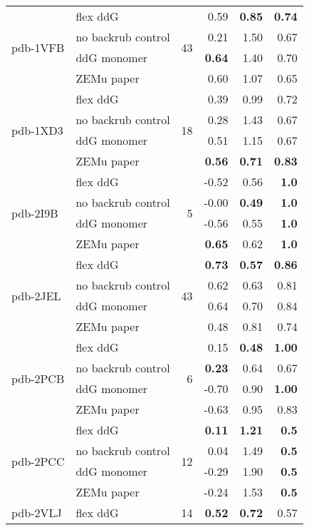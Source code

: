 \begin{longtable}{llrrrr}
\hline
 \multirow{ 4}{*}{pdb-1VFB} & flex ddG & \multirow{ 4}{*}{43} & 0.59 & \textbf{0.85} & \textbf{0.74}  \\
 & no backrub control & & 0.21 & 1.50 & 0.67  \\
 & ddG monomer & & \textbf{0.64} & 1.40 & 0.70  \\
 & ZEMu paper & & 0.60 & 1.07 & 0.65  \\
\hline
 \multirow{ 4}{*}{pdb-1XD3} & flex ddG & \multirow{ 4}{*}{18} & 0.39 & 0.99 & 0.72  \\
 & no backrub control & & 0.28 & 1.43 & 0.67  \\
 & ddG monomer & & 0.51 & 1.15 & 0.67  \\
 & ZEMu paper & & \textbf{0.56} & \textbf{0.71} & \textbf{0.83}  \\
\hline
 \multirow{ 4}{*}{pdb-2I9B} & flex ddG & \multirow{ 4}{*}{5} & -0.52 & 0.56 & \textbf{1.0}  \\
 & no backrub control & & -0.00 & \textbf{0.49} & \textbf{1.0}  \\
 & ddG monomer & & -0.56 & 0.55 & \textbf{1.0}  \\
 & ZEMu paper & & \textbf{0.65} & 0.62 & \textbf{1.0}  \\
\hline
 \multirow{ 4}{*}{pdb-2JEL} & flex ddG & \multirow{ 4}{*}{43} & \textbf{0.73} & \textbf{0.57} & \textbf{0.86}  \\
 & no backrub control & & 0.62 & 0.63 & 0.81  \\
 & ddG monomer & & 0.64 & 0.70 & 0.84  \\
 & ZEMu paper & & 0.48 & 0.81 & 0.74  \\
\hline
 \multirow{ 4}{*}{pdb-2PCB} & flex ddG & \multirow{ 4}{*}{6} & 0.15 & \textbf{0.48} & \textbf{1.00}  \\
 & no backrub control & & \textbf{0.23} & 0.64 & 0.67  \\
 & ddG monomer & & -0.70 & 0.90 & \textbf{1.00}  \\
 & ZEMu paper & & -0.63 & 0.95 & 0.83  \\
\hline
 \multirow{ 4}{*}{pdb-2PCC} & flex ddG & \multirow{ 4}{*}{12} & \textbf{0.11} & \textbf{1.21} & \textbf{0.5}  \\
 & no backrub control & & 0.04 & 1.49 & \textbf{0.5}  \\
 & ddG monomer & & -0.29 & 1.90 & \textbf{0.5}  \\
 & ZEMu paper & & -0.24 & 1.53 & \textbf{0.5}  \\
\hline
 \multirow{ 4}{*}{pdb-2VLJ} & flex ddG & \multirow{ 4}{*}{14} & \textbf{0.52} & \textbf{0.72} & 0.57  \\

\end{longtable}

